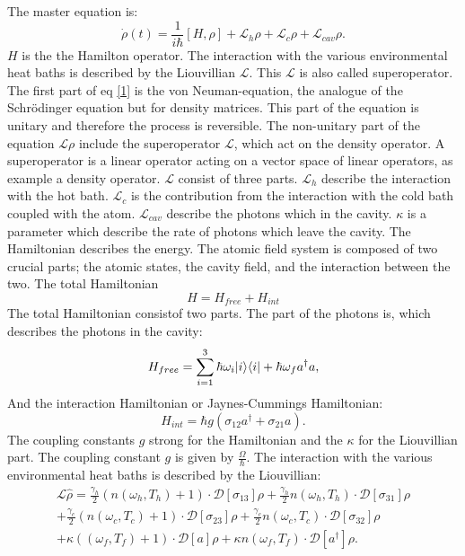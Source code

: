 \documentclass[12pt,a4paper]{article}
\DeclarePairedDelimiter\bra{\langle}{\rvert}
\DeclarePairedDelimiter\ket{\lvert}{\rangle}
\begin{document}
The master equation is:
\begin{equation}
\dot{\rho}(t)=\frac{1}{i \hbar}[H,\rho]+ \mathcal{L}_{h}\rho+ \mathcal{L}_{c}\rho+ \mathcal{L}_{cav}\rho. \label{1}
\end{equation}
$H$ is the the Hamilton operator. The interaction with the various environmental heat baths is described by the Liouvillian $\mathcal{L}$. This $\mathcal{L}$ is also called superoperator. 
The first part of eq \eqref{1} is the von Neuman-equation,  the analogue of the Schrödinger equation but for density matrices. This part of the equation is unitary and therefore the process is reversible.
The non-unitary part of the equation $\mathcal{L}\rho$ include the superoperator $\mathcal{L}$, which act on the density operator.  A superoperator is a linear operator acting on a vector space of linear operators, as example a density operator.
$\mathcal{L}$ consist of three parts. $\mathcal{L}_h $ describe the interaction with the hot bath.
$\mathcal{L}_c$ is the contribution from the interaction with the cold bath coupled with the atom.
$\mathcal{L}_{cav}$ describe the photons which in the cavity. $\kappa$ is a parameter which describe the rate of photons which leave the cavity.
The Hamiltonian describes the energy. 
The atomic field system is composed of two crucial 
parts; the atomic states, the cavity field, and the interaction between the two.
The total Hamiltonian
\begin{equation}
H=H_{free}+H_{int}
\end{equation}
The total Hamiltonian consistof two parts. The part of the photons is, which describes the photons in the cavity:
\begin{equation}
H_{free}=\sum_{i=1}^3 \hbar \omega_i \ket{i}\bra{i}+\hbar \omega_f a^{\dag}a,\label{2}
\end{equation}
And the interaction Hamiltonian or Jaynes-Cummings Hamiltonian:
\begin{equation}
H_{int}=\hbar g(\sigma_{12}a^{\dag}+\sigma_{21}a).\label{3}
\end{equation}
The coupling constants $g$ strong for the Hamiltonian and the $\kappa$ for the Liouvillian part. 
The coupling constant $g$ is given by $\frac{\Omega}{\hbar}$.
\newpage
The interaction with the various environmental heat baths is described by the Liouvillian:
\begin{equation}
\begin{aligned}
\mathcal{L}\hat{\rho}=\frac{\gamma_h}{2}(n(\omega_h,T_h)+1)   \cdot \mathcal{D}[\sigma_{13}]\rho
+\frac{\gamma_h}{2}n(\omega_h,T_h)\cdot \mathcal{D}[\sigma_{31}]\rho \\
+\frac{\gamma_c}{2}(n(\omega_c,T_c)+1)\cdot \mathcal{D}[\sigma_{23}]\rho
+\frac{\gamma_c}{2}n(\omega_c,T_c) \cdot \mathcal{D}[\sigma_{32}]\rho \\
+\kappa((\omega_f,T_f)+1)	\cdot\mathcal{D}[a]\rho+
\kappa n(\omega_f,T_f)\cdot \mathcal{D}[a^{\dag}]\rho.
\end{aligned}
\end{equation}
\end{document}
